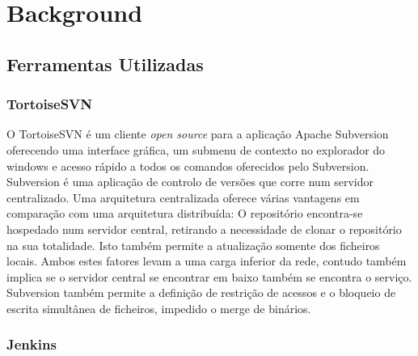 \documentclass[sigplan]{acmart}
\begin{document}
\section{Background} \label{sec:background}

\subsection{Ferramentas Utilizadas}



\subsubsection{TortoiseSVN}

O TortoiseSVN é um cliente \textit{open source} para a aplicação Apache Subversion oferecendo uma interface gráfica, um submenu de contexto no explorador do windows e acesso rápido a todos os comandos oferecidos pelo Subversion. Subversion é uma aplicação de controlo de versões que corre num servidor centralizado. Uma arquitetura centralizada oferece várias vantagens em comparação com uma arquitetura distribuída: O repositório encontra-se hospedado num servidor central, retirando a necessidade de clonar o repositório na sua totalidade. Isto também permite a atualização somente dos ficheiros locais. Ambos estes fatores levam a uma carga inferior da rede, contudo também implica se o servidor central se encontrar em baixo também se encontra o serviço. Subversion também permite a definição de restrição de acessos e o bloqueio de escrita simultânea de ficheiros, impedido o merge de binários.

\subsubsection{Jenkins}
\end{document}
